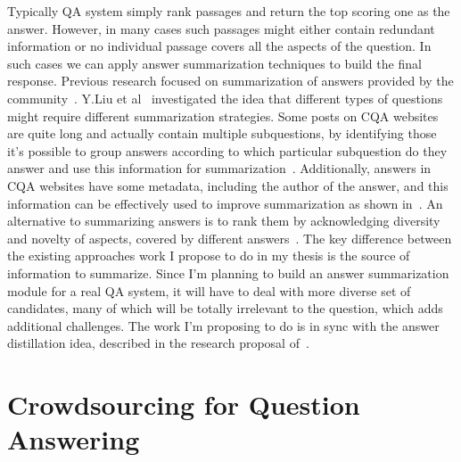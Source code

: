 Typically QA system simply rank passages and return the top scoring one as the answer.
However, in many cases such passages might either contain redundant information or no individual passage covers all the aspects of the question.
In such cases we can apply answer summarization techniques to build the final response.
Previous research focused on summarization of answers provided by the community~\cite{liu2008understanding,tomasoni2010metadata,pande2013summarizing,chan2012community,zhaochun_sparsecoding_2016}.
Y.Liu et al~\cite{liu2008understanding} investigated the idea that different types of questions might require different summarization strategies.
Some posts on CQA websites are quite long and actually contain multiple subquestions, by identifying those it's possible to group answers according to which particular subquestion do they answer and use this information for summarization~\cite{chan2012community,pande2013summarizing}.
Additionally, answers in CQA websites have some metadata, including the author of the answer, and this information can be effectively used to improve summarization as shown in~\cite{tomasoni2010metadata}.
An alternative to summarizing answers is to rank them by acknowledging diversity and novelty of aspects, covered by different answers~\cite{omari2016novelty}.
The key difference between the existing approaches work I propose to do in my thesis is the source of information to summarize.
Since I'm planning to build an answer summarization module for a real QA system, it will have to deal with more diverse set of candidates, many of which will be totally irrelevant to the question, which adds additional challenges.
The work I'm proposing to do is in sync with the answer distillation idea, described in the research proposal of~\cite{mitra2016distillation}.


\section{Crowdsourcing for Question Answering}
\label{section:relatedework:crowdsourcing}

